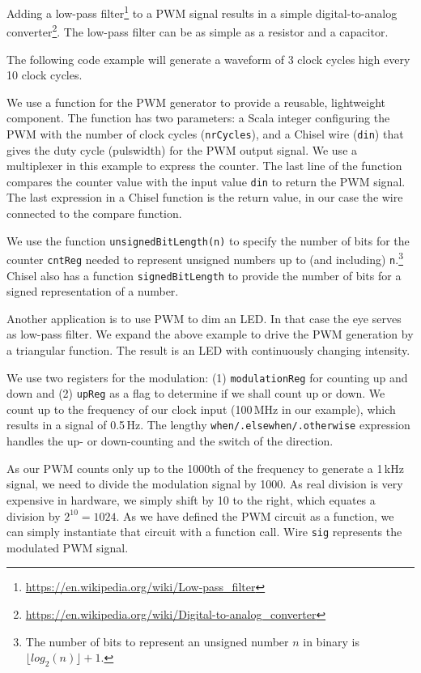 \documentclass[%
    10pt,
    headinclude, footexclude,
    openright, %
    notitlepage,
    cleardoubleempty,
    headsepline,
    pointlessnumbers,
    bibtotoc, idxtotoc,
    ]{scrbook}
\newcommand{\code}[1]{{\small{\texttt{#1}}}}
\newcommand{\myref}[2]{\href{#1}{#2}}
\renewcommand{\myref}[2]{{#2}{\footnote{\url{#1}}}}
\begin{document}
Adding a \myref{https://en.wikipedia.org/wiki/Low-pass_filter}{low-pass filter} to a PWM
signal results in a simple
\myref{https://en.wikipedia.org/wiki/Digital-to-analog_converter}{digital-to-analog converter}.
The low-pass filter can be as simple as a resistor and a capacitor.

The following code example will generate a waveform of 3 clock cycles high every 10 clock cycles.


\noindent We use a function for the PWM generator to provide a reusable, lightweight component.
The function has two parameters: a Scala integer configuring the PWM with the number of
clock cycles (\code{nrCycles}), and a Chisel wire (\code{din}) that gives the duty cycle (pulswidth) for the
PWM output signal. We use a multiplexer in this
example to express the counter. The last line of the function compares the counter value
with the input value \code{din} to return the PWM signal. The last expression in a Chisel function
is the return value, in our case the wire connected to the compare function.

We use the function \code{unsignedBitLength(n)} to specify the number of bits for the counter
\code{cntReg} needed to represent unsigned numbers up to (and including)
\code{n}.\footnote{The number of bits to represent an unsigned number $n$ in binary is $\lfloor log_2(n) \rfloor + 1$.}
Chisel also has a function \code{signedBitLength} to provide the number of bits
for a signed representation of a number.


Another application is to use PWM to dim an LED. In that case the eye serves as low-pass
filter. We expand the above example to drive the PWM generation by a triangular function.
The result is an LED with continuously changing intensity.


We use two registers for the modulation: (1) \code{modulationReg} for counting up and down
and (2) \code{upReg} as a flag to determine if we shall count up or down. We count up
to the frequency of our clock input (100\,MHz in our example), which results in a signal
of 0.5\,Hz. The lengthy \code{when/.elsewhen/.otherwise} expression handles the up- or
down-counting and the switch of the direction.

As our PWM counts only up to the 1000th of the frequency to generate a 1\,kHz signal,
we need to divide the modulation signal by 1000. As real division is very expensive in hardware,
we simply shift by 10 to the right, which equates a division by $2^{10} = 1024$.
As we have defined the PWM circuit as a function, we can simply instantiate that circuit
with a function call. Wire \code{sig} represents the modulated PWM signal.
\end{document}
